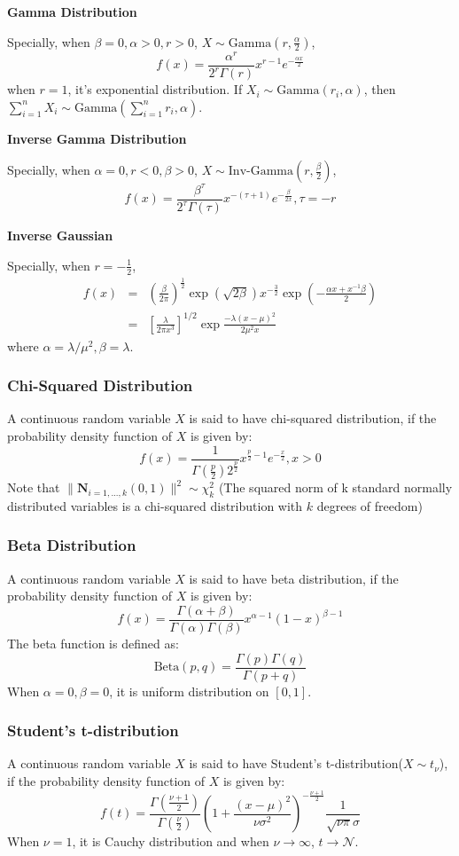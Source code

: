 \documentclass[11pt]{article}
\def\MN{{\mathcal N}}
\begin{document}
\textbf{Gamma Distribution}

Specially, when $\beta=0, \alpha>0, r>0$, $X\sim \mbox{Gamma}(r,\frac{\alpha}{2})$,
$$
f(x) = \frac{\alpha^r}{2^r\Gamma(r)} x^{r-1} e^{- \frac{\alpha x}{2} }
$$
when $r=1$, it's exponential distribution. If $X_i\sim  \mbox{Gamma}(r_i,\alpha)$, then $\sum_{i=1}^{n}X_i\sim \mbox{Gamma}({\sum_{i=1}^n{r_i},\alpha})$.

\textbf{Inverse Gamma Distribution}

Specially, when $\alpha=0, r<0, \beta>0$, $X\sim \mbox{Inv-Gamma}(r,\frac{\beta}{2})$,
$$
f(x) = \frac{\beta^\tau}{2^\tau\Gamma(\tau)} x^{-(\tau+1)} e^{- \frac{\beta}{2x} },\tau=-r
$$

\textbf{Inverse Gaussian}

Specially, when $r=-\frac{1}{2}$,
\begin{eqnarray*}
f(x) &=& \left(\frac{\beta}{2\pi}\right)^{\frac{1}{2}}\exp({\sqrt{2\beta}})x^{-\frac{3}{2}}\exp(-\frac{\alpha x+x^{-1}\beta}{2})\\
&=& \left[\frac{\lambda}{2 \pi x^3}\right]^{1/2} \exp{\frac{-\lambda (x-\mu)^2}{2 \mu^2 x}} 
\end{eqnarray*}
where $\alpha = \lambda/\mu^2, \beta = \lambda$.

\subsubsection{Chi-Squared Distribution}
A continuous random variable $X$ is said to have chi-squared distribution, if the probability density function of $X$ is given by:
\[f(x) = \frac{1}{\Gamma(\frac{p}{2})2^{\frac{p}{2}}} x^{\frac{p}{2} - 1} e^{-\frac{x}{2}}, x>0\]
Note that $\|\boldsymbol{N}_{i=1,...,k}{(0,1)}\|^2 \sim \chi^2_k$ (The squared norm of k standard normally distributed variables is a chi-squared distribution with $k$ degrees of freedom)

\subsubsection{Beta Distribution}
A continuous random variable $X$ is said to have beta distribution, if the probability density function of $X$ is given by:
\[f(x) = \frac{\Gamma(\alpha + \beta)}{\Gamma(\alpha)\Gamma(\beta)} x^{\alpha - 1} (1-x)^{\beta - 1}\]
The beta function is defined as:
$$
\mbox{Beta}(p,q)=\frac{\Gamma(p)\Gamma(q)}{\Gamma(p+q)}
$$
When $\alpha=0,\beta=0$, it is uniform distribution on $[0,1]$.

\subsubsection{Student's t-distribution}
A continuous random variable $X$ is said to have Student's t-distribution($X\sim t_\nu$), if the probability density function of $X$ is given by:
$$
f(t) = \frac{\Gamma(\frac{\nu+1}{2})}{\Gamma(\frac{\nu}{2})} \left(1+\frac{(x-\mu)^2}{\nu\sigma^2}\right)^{-\frac{\nu+1}{2}} \frac{1}{\sqrt{\nu\pi}\sigma}
$$
When $\nu=1$, it is Cauchy distribution and when $\nu\rightarrow\infty$, $t\rightarrow\MN$.
\end{document}
